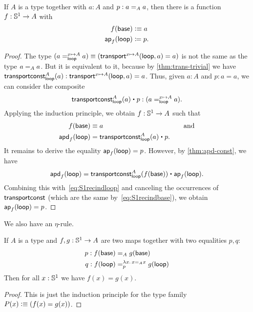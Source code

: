 \begin{lem}\label{thm:S1rec}
  If $A$ is a type together with $a:A$ and $p:\id[A]aa$, then there is a
  function $f:\Sn^1\to{}A$ with
  \begin{align*}
    f(\base)&\defeq a \\
    \apfunc f(\lloop)&\defid p.
  \end{align*}
\end{lem}
\begin{proof}
  The type $(\dpath {x \mapsto A}{\lloop} a a)\jdeq (\transfib{x \mapsto A}{\lloop} a = a)$ is not the same as the type $\id[A]aa$.
  But it is equivalent to it, because by \autoref{thm:trans-trivial} we have $\transconst{A}{\lloop}{a} : \transfib{x \mapsto A}{\lloop} a= a$.
  Thus, given $a:A$ and $p:a=a$, we can consider the composite
  \[\transconst{A}{\lloop}{a} \ct p:(\dpath {x \mapsto A}\lloop aa).\]
  Applying the induction principle, we obtain $f:\Sn^1\to A$ such that
  \begin{alignat}{2}
    f(\base) &\jdeq a & \quad\text{and}\label{eq:S1recindbase}\\
    \apdfunc f(\lloop) &= \transconst{A}{\lloop}{a} \ct p.\label{eq:S1recindloop}
  \end{alignat}
  It remains to derive the equality $\apfunc f(\lloop)=p$.
  However, by \autoref{thm:apd-const}, we have
  \[\apdfunc f(\lloop) = \transconst{A}{\lloop}{f(\base)} \ct \apfunc f(\lloop).\]
  Combining this with~\eqref{eq:S1recindloop} and canceling the occurrences of $\transconstf$ (which are the same by~\eqref{eq:S1recindbase}), we obtain $\apfunc f(\lloop)=p$.
\end{proof}

We also have an $\eta$-rule.

\begin{lem}
  If $A$ is a type and $f,g:\Sn^1\to{}A$ are two maps together with two
  equalities $p,q$:
  \begin{align*}
    p:f(\base)&=_Ag(\base)\\
    q:\map{f}\lloop&=^{\lambda{}x.\,x=_Ax}_p\map{g}\lloop
  \end{align*}
  Then for all $x:\Sn^1$ we have $f(x)=g(x)$.
\end{lem}
\begin{proof}
  This is just the induction principle for the type family $P(x)\defeq(f(x)=g(x))$.
\end{proof}

